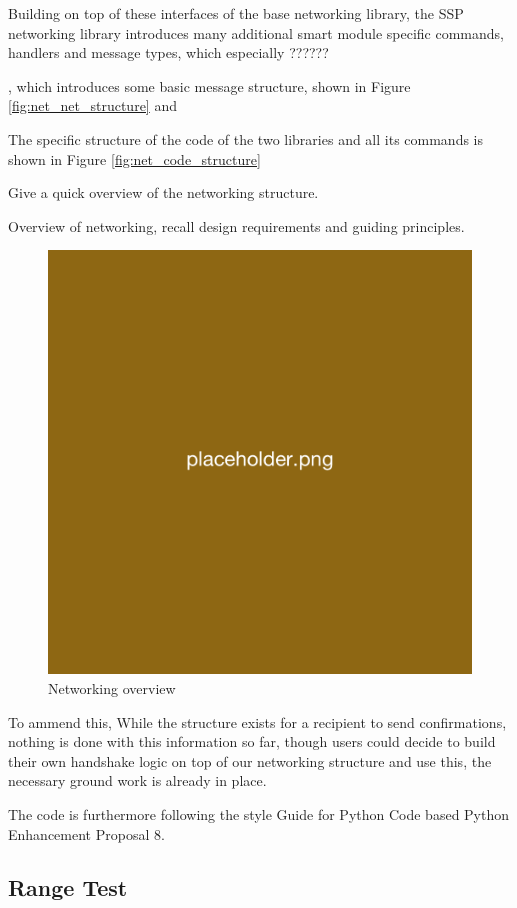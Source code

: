 Building on top of these interfaces of the base networking library, the SSP networking library introduces many additional smart module specific commands, handlers and message types, which especially ??????



, which introduces some basic message structure, shown in Figure \ref{fig:net_net_structure} and 

The specific structure of the code of the two libraries and all its commands is shown in Figure \ref{fig:net_code_structure}




Give a quick overview of the networking structure. 

Overview of networking, recall design requirements and guiding principles.

\begin{figure}[H]
    \centering
    \includegraphics[width=.5\linewidth]{overleaf/images/placeholder.png}
    \vspace{\ftspace}
    \caption{Networking overview}
    \label{fig:Networking overview}
\end{figure}

To ammend this, 
While the structure exists for a recipient to send confirmations, nothing is done with this information so far, though users could decide to build their own handshake logic on top of our networking structure and use this, the necessary ground work is already in place.

The code is furthermore following the style Guide for Python Code based Python Enhancement Proposal 8. \citep{rossum_python_2001}

\subsection{\label{sec:res_range}Range Test}

